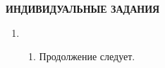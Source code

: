 \documentclass{article}
\begin{document}
\newpage

\bigskip\sloppy

\noindent\centerline{\textbf{ИНДИВИДУАЛЬНЫЕ ЗАДАНИЯ}}


\begin{enumerate}[label={}, leftmargin=0pt, itemindent=0pt]

\item

\begin{enumerate}[label=\arabic{enumi}.\arabic*.] %
\item
Продолжение следует.

\end{enumerate}

\end{enumerate}
\end{document}
